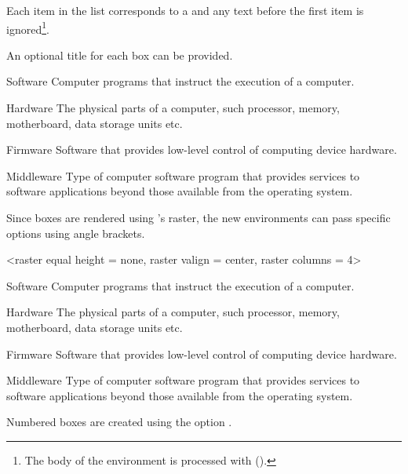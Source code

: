 \documentclass[a4paper, 11pt]{article}
\begin{document}
Each item in the list corresponds to a  and any text before the first item is ignored\footnote{The body of the environment is processed with  ().}.

An optional title for each box can be provided.

\begin{example}{}
    \begin{PLTBoxRaster}
        \item[Software] Computer programs that instruct the execution of a computer.
        \item[Hardware] The physical parts of a computer, such processor, memory, motherboard, data storage units etc.
        \item[Firmware] Software that provides low-level control of computing device hardware.
        \item[Middleware] Type of computer software program that provides services to software applications beyond those available from the operating system.
    \end{PLTBoxRaster}
\end{example}

Since boxes are rendered using 's raster, the new environments can pass specific options using angle brackets.

\begin{example}{}
    \begin{PLTBoxRaster}
        <raster equal height = none, raster valign = center, raster columns = 4>
        \item[Software] Computer programs that instruct the execution of a computer.
        \item[Hardware] The physical parts of a computer, such processor, memory, motherboard, data storage units etc.
        \item[Firmware] Software that provides low-level control of computing device hardware.
        \item[Middleware] Type of computer software program that provides services to software applications beyond those available from the operating system.
    \end{PLTBoxRaster}
\end{example}

Numbered boxes are created using the option .
\end{document}
